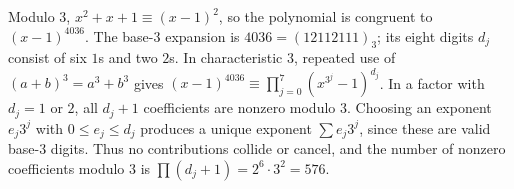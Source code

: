 Modulo $3$, $x^2+x+1\equiv(x-1)^2$, so the polynomial is congruent to $(x-1)^{4036}$. The base-$3$ expansion is $4036=(12112111)_3$; its eight digits $d_j$ consist of six $1$s and two $2$s. In characteristic $3$, repeated use of $(a+b)^3=a^3+b^3$ gives $(x-1)^{4036}\equiv\prod_{j=0}^7(x^{3^j}-1)^{d_j}$. In a factor with $d_j=1$ or $2$, all $d_j+1$ coefficients are nonzero modulo $3$. Choosing an exponent $e_j3^j$ with $0\le e_j\le d_j$ produces a unique exponent $\sum e_j3^j$, since these are valid base-$3$ digits. Thus no contributions collide or cancel, and the number of nonzero coefficients modulo $3$ is $\prod(d_j+1)=2^6\cdot3^2=\boxed{576}$.
